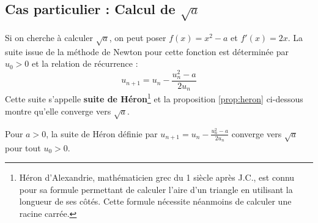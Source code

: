 \subsection{Cas particulier : Calcul de $\sqrt{a}$}

Si on cherche à calculer $\sqrt{a}$, on peut poser $f(x)=x^2-a$ et $f'(x)=2x$. La suite issue de la méthode de Newton pour cette fonction est déterminée par $u_0>0$ et la relation de récurrence : $$u_{n+1} = u_n - \frac{u_n^2-a}{2u_n}$$
Cette suite s'appelle \textbf{suite de Héron}\footnote{Héron d'Alexandrie, mathématicien grec du 1 siècle après J.C., est connu pour sa formule permettant de calculer l'aire d'un triangle en utilisant la longueur de ses côtés. Cette formule nécessite néanmoins de calculer une racine carrée.} et la proposition \ref*{prop:heron} ci-dessous montre qu'elle converge vers $\sqrt{a}$.






\bigskip
\begin{proposition}
\label{prop:heron}
Pour $a>0$, la suite de Héron définie par $u_{n+1} = u_n - \frac{u_n^2-a}{2u_n}$
 converge vers $\sqrt{a}$ pour tout $u_0>0$.
\end{proposition}

